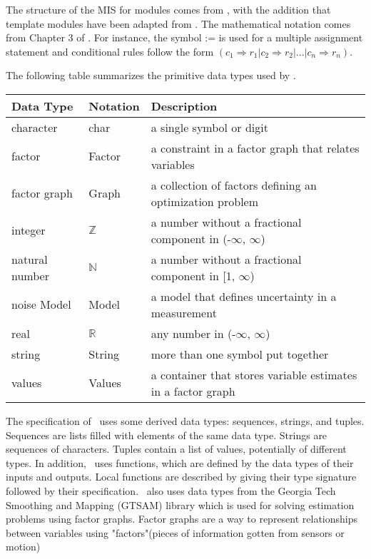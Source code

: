 \documentclass[12pt, titlepage]{article}
\begin{document}
The structure of the MIS for modules comes from \citet{HoffmanAndStrooper1995},
with the addition that template modules have been adapted from
\cite{GhezziEtAl2003}.  The mathematical notation comes from Chapter 3 of
\citet{HoffmanAndStrooper1995}.  For instance, the symbol := is used for a
multiple assignment statement and conditional rules follow the form $(c_1
\Rightarrow r_1 | c_2 \Rightarrow r_2 | ... | c_n \Rightarrow r_n )$.

The following table summarizes the primitive data types used by \progname. 

\begin{center}
\renewcommand{\arraystretch}{1.2}
\noindent 
\begin{tabular}{l l p{7.5cm}} 
\toprule 
\textbf{Data Type} & \textbf{Notation} & \textbf{Description}\\ 
\midrule
character & char & a single symbol or digit\\
factor & Factor & a constraint in a factor graph that relates variables\\
factor graph & Graph & a collection of factors defining an optimization problem\\
integer & $\mathbb{Z}$ & a number without a fractional component in (-$\infty$, $\infty$) \\
natural number & $\mathbb{N}$ & a number without a fractional component in [1, $\infty$) \\
noise Model & Model & a model that defines uncertainty in a measurement \\
real & $\mathbb{R}$ & any number in (-$\infty$, $\infty$)\\
string & String & more than one symbol put together\\
values & Values & a container that stores variable estimates in a factor graph\\
\bottomrule
\end{tabular} 
\end{center}

\noindent
The specification of \progname \ uses some derived data types: sequences, strings, and
tuples. Sequences are lists filled with elements of the same data type. Strings
are sequences of characters. Tuples contain a list of values, potentially of
different types. In addition, \progname \ uses functions, which
are defined by the data types of their inputs and outputs. Local functions are
described by giving their type signature followed by their specification. \progname~also uses data types from the Georgia Tech Smoothing and Mapping (GTSAM) library which is used for solving estimation problems using factor graphs. Factor graphs are a way to represent relationships between variables using "factors"(pieces of information gotten from sensors or motion)
\end{document}
